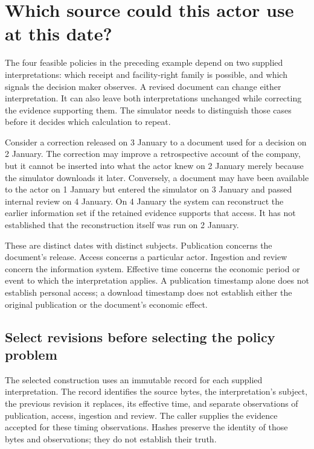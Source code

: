 \section{Which source could this actor use at this date?}
\label{sim:source-timed-policies}

The four feasible policies in the preceding example depend on two supplied interpretations: which receipt and facility-right family is possible, and which signals the decision maker observes. A revised document can change either interpretation. It can also leave both interpretations unchanged while correcting the evidence supporting them. The simulator needs to distinguish those cases before it decides which calculation to repeat.

Consider a correction released on 3 January to a document used for a decision on 2 January. The correction may improve a retrospective account of the company, but it cannot be inserted into what the actor knew on 2 January merely because the simulator downloads it later. Conversely, a document may have been available to the actor on 1 January but entered the simulator on 3 January and passed internal review on 4 January. On 4 January the system can reconstruct the earlier information set if the retained evidence supports that access. It has not established that the reconstruction itself was run on 2 January.

These are distinct dates with distinct subjects. Publication concerns the document's release. Access concerns a particular actor. Ingestion and review concern the information system. Effective time concerns the economic period or event to which the interpretation applies. A publication timestamp alone does not establish personal access; a download timestamp does not establish either the original publication or the document's economic effect.

\subsection{Select revisions before selecting the policy problem}

The selected construction uses an immutable record for each supplied interpretation. The record identifies the source bytes, the interpretation's subject, the previous revision it replaces, its effective time, and separate observations of publication, access, ingestion and review. The caller supplies the evidence accepted for these timing observations. Hashes preserve the identity of those bytes and observations; they do not establish their truth.

